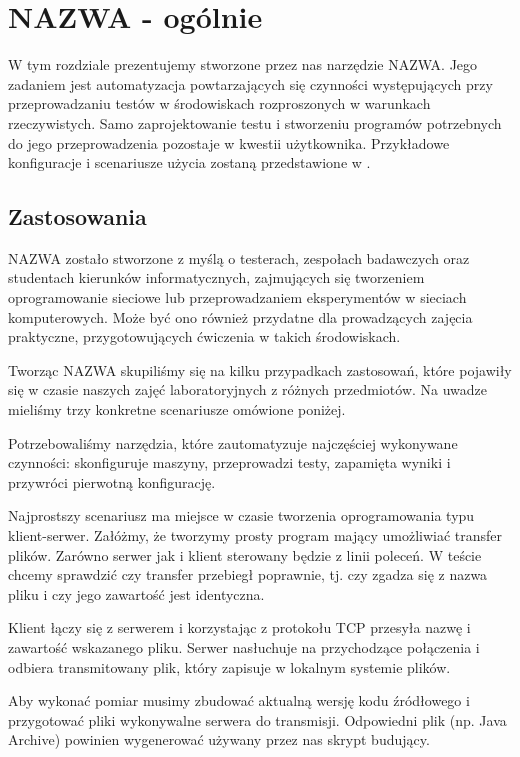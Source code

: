 \documentclass[00-praca-magisterska.tex]{subfiles}
\begin{document}
\chapter{NAZWA - ogólnie}

W tym rozdziale prezentujemy stworzone przez nas narzędzie NAZWA. Jego zadaniem
jest automatyzacja powtarzających się czynności występujących przy
przeprowadzaniu testów w środowiskach rozproszonych w warunkach rzeczywistych.
Samo zaprojektowanie testu i stworzeniu programów potrzebnych do jego
przeprowadzenia pozostaje w kwestii użytkownika. Przykładowe konfiguracje i
scenariusze użycia zostaną przedstawione w .

\section{Zastosowania}

NAZWA zostało stworzone z myślą o testerach, zespołach badawczych oraz
studentach kierunków informatycznych, zajmujących się tworzeniem oprogramowanie
sieciowe lub przeprowadzaniem eksperymentów w sieciach komputerowych. Może być
ono również przydatne dla prowadzących zajęcia praktyczne, przygotowujących
ćwiczenia w takich środowiskach.

Tworząc NAZWA skupiliśmy się na kilku przypadkach zastosowań, które pojawiły
się w czasie naszych zajęć laboratoryjnych z różnych przedmiotów. Na uwadze
mieliśmy trzy konkretne scenariusze omówione poniżej.

Potrzebowaliśmy narzędzia, które zautomatyzuje najczęściej wykonywane
czynności: skonfiguruje maszyny, przeprowadzi testy, zapamięta wyniki i
przywróci pierwotną konfigurację.

Najprostszy scenariusz ma miejsce w czasie tworzenia oprogramowania typu
klient-serwer. Załóżmy, że tworzymy prosty program mający umożliwiać transfer
plików. Zarówno serwer jak i klient sterowany będzie z linii poleceń. W teście
chcemy sprawdzić czy transfer przebiegł poprawnie, tj. czy zgadza się z nazwa
pliku i czy jego zawartość jest identyczna.

Klient łączy się z serwerem i korzystając z protokołu TCP przesyła nazwę i
zawartość wskazanego pliku. Serwer nasłuchuje na przychodzące połączenia i
odbiera transmitowany plik, który zapisuje w lokalnym systemie plików.

Aby wykonać pomiar musimy zbudować aktualną wersję kodu źródłowego i
przygotować pliki wykonywalne serwera do transmisji. Odpowiedni plik (np. Java
Archive) powinien wygenerować używany przez nas skrypt budujący.
\end{document}
